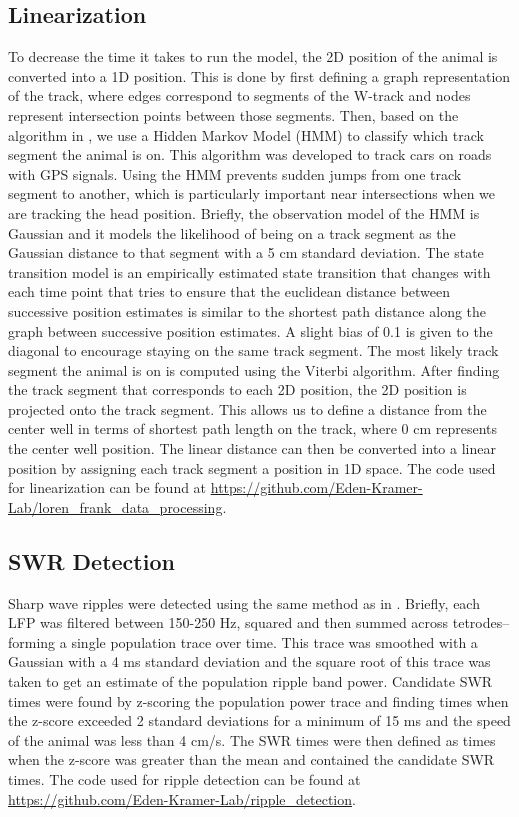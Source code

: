 \documentclass[times, twoside]{zHenriquesLab-StyleBioRxiv}
\begin{document}
\subsection*{Linearization}
To decrease the time it takes to run the model, the 2D position of the animal is converted into a 1D position. This is done by first defining a graph representation of the track, where edges correspond to segments of the W-track and nodes represent intersection points between those segments. Then, based on the algorithm in \cite{NewsonHiddenMarkovmap2009}, we use a Hidden Markov Model (HMM) to classify which track segment the animal is on. This algorithm was developed to track cars on roads with GPS signals. Using the HMM prevents sudden jumps from one track segment to another, which is particularly important near intersections when we are tracking the head position. Briefly, the observation model of the HMM is Gaussian and it models the likelihood of being on a track segment as the Gaussian distance to that segment with a 5 cm standard deviation. The state transition model is an empirically estimated state transition that changes with each time point that tries to ensure that the euclidean distance between successive position estimates is similar to the shortest path distance along the graph between successive position estimates. A slight bias of 0.1 is given to the diagonal to encourage staying on the same track segment. The most likely track segment the animal is on is computed using the Viterbi algorithm. After finding the track segment that corresponds to each 2D position, the 2D position is projected onto the track segment. This allows us to define a distance from the center well in terms of shortest path length on the track, where 0 cm represents the center well position. The linear distance can then be converted into a linear position by assigning each track segment a position in 1D space. The code used for linearization can be found at \url{https://github.com/Eden-Kramer-Lab/loren_frank_data_processing}.

\subsection*{SWR Detection}
Sharp wave ripples were detected using the same method as in \cite{Kayhippocampalnetworkspatial2016}. Briefly, each LFP was filtered between 150-250 Hz, squared and then summed across tetrodes--forming a single population trace over time. This trace was smoothed with a Gaussian with a 4 ms standard deviation and the square root of this trace was taken to get an estimate of the population ripple band power. Candidate SWR times were found by z-scoring the population power trace and finding times when the z-score exceeded 2 standard deviations for a minimum of 15 ms and the speed of the animal was less than 4 cm/s. The SWR times were then defined as times when the z-score was greater than the mean and contained the candidate SWR times. The code used for ripple detection can be found at \url{https://github.com/Eden-Kramer-Lab/ripple_detection}.
\end{document}
